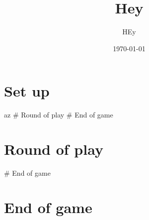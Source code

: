 \documentclass{article}%
\title{Hey}%
\author{HEy}%
\date{\today}%
\begin{document}
%
\pagestyle{empty}%
\normalsize%
\maketitle%
\section{ Set up 
}%
\label{sec:Setup}%
		az
%
\# Round of play
%
\# End of game

%
\section{ Round of play
}%
\label{sec:Roundofplay}%
\# End of game

%
\section{ End of game}%
\label{sec:Endofgame}%

%
\end{document}
